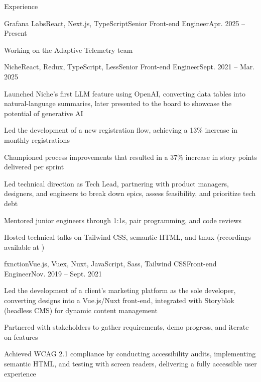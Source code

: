 \documentclass{resume} %
\begin{document}
\begin{rSection}{Experience}

  \begin{rSubsection}{Grafana Labs}{React, Next.js, TypeScript}{Senior Front-end Engineer}{Apr. 2025 – Present}
    \item Working on the Adaptive Telemetry team
  \end{rSubsection}
  
  \begin{rSubsection}{Niche}{React, Redux, TypeScript, Less}{Senior Front-end Engineer}{Sept. 2021 – Mar. 2025}
    \item Launched Niche’s first LLM feature using OpenAI, converting data tables into natural-language summaries, later presented to the board to showcase the potential of generative AI
    \item Led the development of a new registration flow, achieving a 13\% increase in monthly registrations

    
    \item Championed process improvements that resulted in a 37\% increase in story points delivered per sprint
    \item Led technical direction as Tech Lead, partnering with product managers, designers, and engineers to break down epics, assess feasibility, and prioritize tech debt
    \item Mentored junior engineers through 1:1s, pair programming, and code reviews
    \item Hosted technical talks on Tailwind CSS, semantic HTML, and tmux (recordings available at \href{http://jgs.lol/}{})
  \end{rSubsection}

  \begin{rSubsection}{fxnction}{Vue.js, Vuex, Nuxt, JavaScript, Sass, Tailwind CSS}{Front-end Engineer}{Nov. 2019 – Sept. 2021}
    \item Led the development of a client’s marketing platform as the sole developer, converting designs into a Vue.js/Nuxt front-end, integrated with Storyblok (headless CMS) for dynamic content management
    \item Partnered with stakeholders to gather requirements, demo progress, and iterate on features
    \item Achieved WCAG 2.1 compliance by conducting accessibility audits, implementing semantic HTML, and testing with screen readers, delivering a fully accessible user experience
  \end{rSubsection}

\end{rSection}
\end{document}
